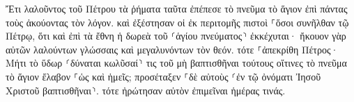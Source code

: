 \documentclass{openreader}
\begin{document}
Ἔτι λαλοῦντος τοῦ Πέτρου τὰ ῥήματα ταῦτα ἐπέπεσε τὸ πνεῦμα τὸ ἅγιον ἐπὶ πάντας τοὺς ἀκούοντας τὸν λόγον. 
καὶ ἐξέστησαν οἱ ἐκ περιτομῆς πιστοὶ ⸀ὅσοι συνῆλθαν τῷ Πέτρῳ, ὅτι καὶ ἐπὶ τὰ ἔθνη ἡ δωρεὰ τοῦ ⸂ἁγίου πνεύματος⸃ ἐκκέχυται· 
ἤκουον γὰρ αὐτῶν λαλούντων γλώσσαις καὶ μεγαλυνόντων τὸν θεόν. τότε ⸀ἀπεκρίθη Πέτρος· 
Μήτι τὸ ὕδωρ ⸂δύναται κωλῦσαί⸃ τις τοῦ μὴ βαπτισθῆναι τούτους οἵτινες τὸ πνεῦμα τὸ ἅγιον ἔλαβον ⸀ὡς καὶ ἡμεῖς; 
προσέταξεν ⸀δὲ αὐτοὺς ⸂ἐν τῷ ὀνόματι Ἰησοῦ Χριστοῦ βαπτισθῆναι⸃. τότε ἠρώτησαν αὐτὸν ἐπιμεῖναι ἡμέρας τινάς. 
\end{document}
